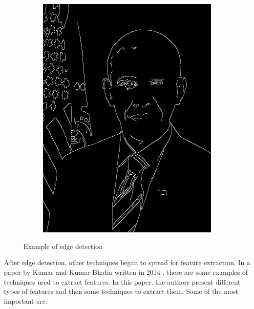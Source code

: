 \documentclass[conference]{IEEEtran}
\begin{document}
\begin{figure}[!ht]
						\begin{subfigure}[!ht]{0.48\linewidth}
							\centerline{\includegraphics[width=0.9\linewidth]{imgs/obama_edges.jpg}}
							\label{fig:1a}
						\end{subfigure}
						\caption{Example of edge detection}
						\label{fig:1}
					\end{figure}
					
					\noindent After edge detection, other techniques began to spread for feature extraction. 
					In a paper by Kumar and Kumar Bhatia written in 2014 \cite{kumar2014detailed}, 
					there are some examples of techniques used to extract features. 
					In this paper, the authors present different types of features and then some techniques to extract them. 
					Some of the most important are:
\end{document}
